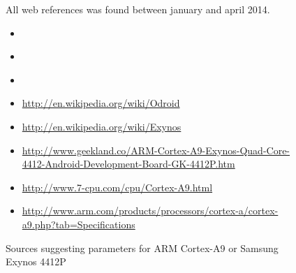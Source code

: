 \begin{figure}
All web references was found between january and april 2014.
\begin{itemize}
    \item{\cite{blem2013detailed}}
    \item{\cite{butko2012accuracy}}
    \item{\cite{armtech}}
    \item{\url{http://en.wikipedia.org/wiki/Odroid}}
    \item{\url{http://en.wikipedia.org/wiki/Exynos}}
    \item{\url{http://www.geekland.co/ARM-Cortex-A9-Exynos-Quad-Core-4412-Android-Development-Board-GK-4412P.htm}}
    \item{\url{http://www.7-cpu.com/cpu/Cortex-A9.html}}
    \item{\url{http://www.arm.com/products/processors/cortex-a/cortex-a9.php?tab=Specifications}}
\end{itemize}
\caption{Sources suggesting parameters for ARM Cortex-A9 or Samsung Exynos 4412P}
\label{fig:a9paramsources}
\end{figure}
